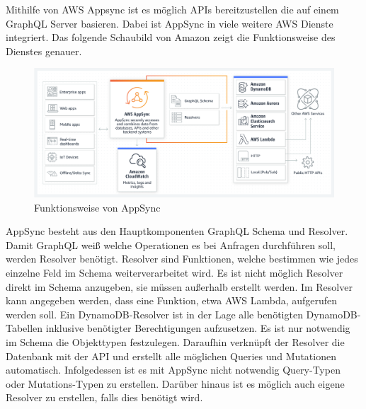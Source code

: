 Mithilfe von AWS Appsync ist es möglich APIs bereitzustellen die auf einem GraphQL Server basieren.
Dabei ist AppSync in viele weitere AWS Dienste integriert.
Das folgende Schaubild von Amazon zeigt die Funktionsweise des Dienstes genauer.
\begin{figure}[htbp]
    \centering
    \includegraphics[width=1.0\textwidth]{40-AWS/Appsync.png}
    \caption{Funktionsweise von AppSync \cite[]{AppSync}  }
    \label{fig:meine-grafik}
\end{figure}

AppSync besteht aus den Hauptkomponenten GraphQL Schema und Resolver.
Damit GraphQL weiß welche Operationen es bei Anfragen durchführen soll, werden Resolver benötigt.
Resolver sind Funktionen, welche bestimmen wie jedes einzelne Feld im Schema weiterverarbeitet wird.
Es ist nicht möglich Resolver direkt im Schema anzugeben, sie müssen außerhalb erstellt werden.
Im Resolver kann angegeben werden, dass eine Funktion, etwa AWS Lambda, aufgerufen werden soll.
Ein DynamoDB-Resolver ist in der Lage alle benötigten DynamoDB-Tabellen inklusive benötigter Berechtigungen aufzusetzen.
Es ist nur notwendig im Schema die Objekttypen festzulegen.
Daraufhin verknüpft der Resolver die Datenbank mit der API und erstellt alle möglichen Queries und Mutationen automatisch.
Infolgedessen ist es mit AppSync nicht notwendig Query-Typen oder Mutations-Typen zu erstellen.
Darüber hinaus ist es möglich auch eigene Resolver zu erstellen, falls dies benötigt wird.


